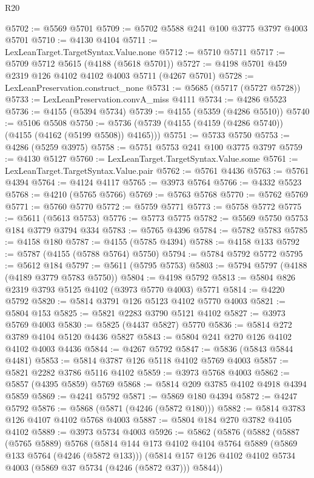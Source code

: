 \begin{lexlean}{R20}
\begin{coremodule}
@5702 := @5569 @5701
@5709 := @5702 @5588 @241 @100 @3775 @3797 @4003 @5701
@5710 := @4130 @4104
@5711 := LexLeanTarget.TargetSyntax.Value.none
@5712 := @5710 @5711
@5717 := @5709 @5712 @5615 (@4188 (@5618 @5701))
@5727 := @4198 @5701 @459 @2319 @126 @4102 @4102 @4003 @5711 (@4267 @5701)
@5728 := LexLeanPreservation.construct_none
@5731 := @5685 (@5717 (@5727 @5728))
@5733 := LexLeanPreservation.convA_miss @4111
@5734 := @4286 @5523
@5736 := @4155 (@5394 @5734)
@5739 := @4155 (@5359 (@4286 @5510))
@5740 := @5106 @5508
@5750 := @5736 (@5739 (@4155 (@4159 (@4286 @5740)) (@4155 (@4162 (@5199 @5508)) @4165)))
@5751 := @5733 @5750
@5753 := @4286 (@5259 @3975)
@5758 := @5751 @5753 @241 @100 @3775 @3797
@5759 := @4130 @5127
@5760 := LexLeanTarget.TargetSyntax.Value.some
@5761 := LexLeanTarget.TargetSyntax.Value.pair
@5762 := @5761 @4436
@5763 := @5761 @4394
@5764 := @4124 @4117
@5765 := @3973 @5764
@5766 := @4332 @5523
@5768 := @4210 (@5765 @5766)
@5769 := @5763 @5768
@5770 := @5762 @5769
@5771 := @5760 @5770
@5772 := @5759 @5771
@5773 := @5758 @5772
@5775 := @5611 (@5613 @5753)
@5776 := @5773 @5775
@5782 := @5569 @5750 @5753 @184 @3779 @3794 @334
@5783 := @5765 @4396
@5784 := @5782 @5783
@5785 := @4158 @180
@5787 := @4155 (@5785 @4394)
@5788 := @4158 @133
@5792 := @5787 (@4155 (@5788 @5764) @5750)
@5794 := @5784 @5792 @5772
@5795 := @5612 @184
@5797 := @5611 (@5795 @5753)
@5803 := @5794 @5797 (@4188 (@4189 @3779 @5783 @5750))
@5804 := @4198 @5792
@5813 := @5804 @826 @2319 @3793 @5125 @4102 (@3973 @5770 @4003) @5771
@5814 := @4220 @5792
@5820 := @5814 @3791 @126 @5123 @4102 @5770 @4003
@5821 := @5804 @153
@5825 := @5821 @2283 @3790 @5121 @4102
@5827 := @3973 @5769 @4003
@5830 := @5825 (@4437 @5827) @5770
@5836 := @5814 @272 @3789 @4104 @5120 @4436 @5827
@5843 := @5804 @241 @270 @126 @4102 @4102 @4003 @4436
@5844 := @4267 @5792
@5847 := @5836 (@5843 @5844 @4481)
@5853 := @5814 @3787 @126 @5118 @4102 @5769 @4003
@5857 := @5821 @2282 @3786 @5116 @4102
@5859 := @3973 @5768 @4003
@5862 := @5857 (@4395 @5859) @5769
@5868 := @5814 @209 @3785 @4102 @4918 @4394 @5859
@5869 := @4241 @5792
@5871 := @5869 @180 @4394
@5872 := @4247 @5792
@5876 := @5868 (@5871 (@4246 (@5872 @180)))
@5882 := @5814 @3783 @126 @4107 @4102 @5768 @4003
@5887 := @5804 @184 @270 @3782 @4105 @4102
@5889 := @3973 @5734 @4003
@5926 := @5862
    (@5876
      (@5882
        (@5887
          (@5765 @5889)
          @5768
          (@5814
            @144
            @173
            @4102
            @4104
            @5764
            @5889
            (@5869 @133 @5764 (@4246 (@5872 @133)))
            (@5814 @157 @126 @4102 @4102 @5734 @4003 (@5869 @37 @5734 (@4246 (@5872 @37))) @5844))

\end{coremodule}
\end{lexlean}

